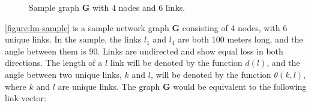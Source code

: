 %
%
%

\begin{figure}[H]
    \centering
    \caption{Sample graph \textbf{G} with 4 nodes and 6 links.}
    \label{figure:lm-sample}
\end{figure}

\autoref{figure:lm-sample} is a sample network graph \textbf{G} consisting of 4 nodes, with 6 unique links. In the sample, the links $l_1$ and $l_4$ are both 100 meters long, and the angle between them is 90\textdegree. Links are undirected and show equal loss in both directions. The length of a $l$ link will be denoted by the function $d(l)$, and the angle between two unique links, $k$ and $l$, will be denoted by the function $\theta(k,l)$, where $k$ and $l$ are unique links. The graph \textbf{G} would be equivalent to the following link vector:

